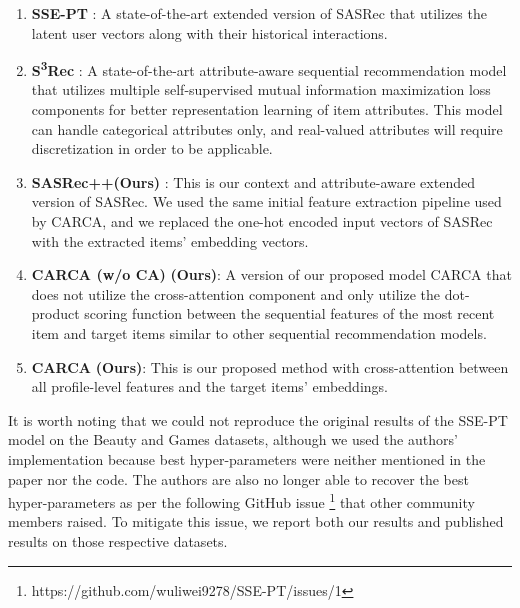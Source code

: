 \documentclass[sigconf,natbib=true]{acmart}
\begin{document}
\begin{enumerate}
 \item \textbf{SSE-PT} \cite{wu2020sse}: A state-of-the-art extended version of SASRec that utilizes the latent user vectors along with their historical interactions. 
 \item \textbf{S\textsuperscript{3}Rec} \cite{ZhouWZZWZWW20}: A state-of-the-art attribute-aware sequential recommendation model that utilizes multiple self-supervised mutual information maximization loss components for better representation learning of item attributes. This model can handle categorical attributes only, and real-valued attributes will require discretization in order to be applicable.
 \item \textbf{SASRec++}\textbf{(Ours)} \cite{kang2018self}: This is our context and attribute-aware extended version of SASRec. We used the same initial feature extraction pipeline used by CARCA, and we replaced the one-hot encoded input vectors of SASRec with the extracted items' embedding vectors.
 
  \item \textbf{CARCA (w/o CA)}\textbf{ (Ours)}: A version of our proposed model CARCA that does not utilize the cross-attention component and only utilize the dot-product scoring function between the sequential features of the most recent item and target items similar to other sequential recommendation models.
  
 \item \textbf{CARCA} \textbf{(Ours)}: This is our proposed method with cross-attention between all profile-level features and the target items' embeddings.
 

\end{enumerate}

It is worth noting that we could not reproduce the original results of the SSE-PT model on the Beauty and Games datasets, although we used the authors' implementation because best hyper-parameters were neither mentioned in the paper nor the code. The authors are also no longer able to recover the best hyper-parameters as per the following GitHub issue \footnote{https://github.com/wuliwei9278/SSE-PT/issues/1} that other community members raised. To mitigate this issue, we report both our results and published results on those respective datasets.
\end{document}
